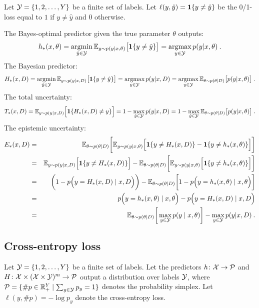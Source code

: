 Let ${\cal Y}=\{1,2,\ldots,Y\}$ be a finite set of labels. Let $\ell(y,\hat{y})=\mathbf{1}{\{ { y\neq \hat{y}}\}}$ be the 0/1-loss equal to $1$ if $y\neq\hat{y}$ and $0$ otherwise.


The Bayes-optimal predictor given the true parameter $\theta$ outputs:
\[
  h_*(x,\theta) = 
  \argmin_{\hat{y}\in\SY} \EE_{y\sim p(y|x,\theta)}\big [\one{ y\neq \hat{y}} \big ] = \argmax_{y\in\SY} p(y|x,\theta )\:.  %
\]
%
The Bayesian predictor:
\[
   H_*(x,D) = 
  \mathop{\rm argmin}_{\hat{y}\in{\cal Y}} {\mathbb{E}}_{y\sim p(y|x,D)}\big [\mathbf{1}{\{ { y\neq \hat{y} }\}}\big ] =  
  \mathop{\rm argmax}_{y\in{\cal Y}} p(y|x,D ) =
  \mathop{\rm argmax}_{y\in{\cal Y}} {\mathbb{E}}_{\theta\sim p(\theta|D)}\big[p(y|x,\theta )\big ]\:.  
\]
%
The total uncertainty:
\[
 T_*(x,D)= {\mathbb{E}}_{y\sim p(y|x,D)}\Big[ \mathbf{1}{\{ { H_*(x,D)\neq y }\}}  \Big ] = 1-\max_{\hat{y}\in{\cal Y}} p(y|x,D) = 1-\max_{\hat{y}\in{\cal Y}}{\mathbb{E}}_{\theta\sim p(\theta|D)}\big[p(y|x,\theta )\big ] \:.
\]
%
The epistemic uncertainty:
\begin{eqnarray*}
  E_*(x,D) & = & {\mathbb{E}}_{\theta \sim p(\theta|D)}\bigg [
  {\mathbb{E}}_{y\sim p(y|x,\theta)} \Big [ 
  \mathbf{1}{\{ { y\neq H_*(x,D)}\}}
  - \mathbf{1}{\{ { y\neq h_*(x,\theta)}\}} 
  \Big ]
  \bigg ] \\
  &=& {\mathbb{E}}_{y\sim p(y|x,D)}\Big[ \mathbf{1}{\{ { y\neq H_*(x,D) }\}} \Big ]
  - {\mathbb{E}}_{\theta\sim p(\theta|D)}\bigg[ 
  {\mathbb{E}}_{y\sim p(y|x,\theta)} \Big [ \mathbf{1}{\{ { y \neq h_*(x,\theta) }\}} \Big ]
  \bigg ] \\
  &=& \bigg (1- p\Big(y=H_*(x,D)\mid x,D\Big ) \bigg ) - {\mathbb{E}}_{\theta\sim p(\theta|D)}\bigg [ 1- p\Big (y=h_*(x,\theta) \mid x,\theta\Big )\bigg ] \\
  & = & p\Big (y=h_*(x,\theta) \mid x,\theta\Big ) - p\Big(y=H_*(x,D)\mid x,D\Big ) \\
  & = & {\mathbb{E}}_{\theta\sim p(\theta|D)}\bigg [\max_{y\in{\cal Y}} p(y\mid x,\theta) \bigg ] - \max_{y\in{\cal Y}} p(y|x,D) \:.
\end{eqnarray*}


\subsection{Cross-entropy loss}

Let ${\cal Y}=\{1,2,\ldots,Y\}$ be a finite set of labels.
Let the predictors $h\colon{\cal X}\rightarrow {\cal P}$ and $H\colon {\cal X}\times({\cal X}\times{\cal Y})^m\rightarrow{\cal P}$ output a distribution over labels ${\cal Y}$, where ${\cal P}=\{\#p\in\mathbb{R}_+^Y\mid \sum_{y\in{\cal Y}}p_y=1\}$ denotes the probability simplex. Let $\ell(y,\#p)=-\log p_y$ denote the cross-entropy loss.


